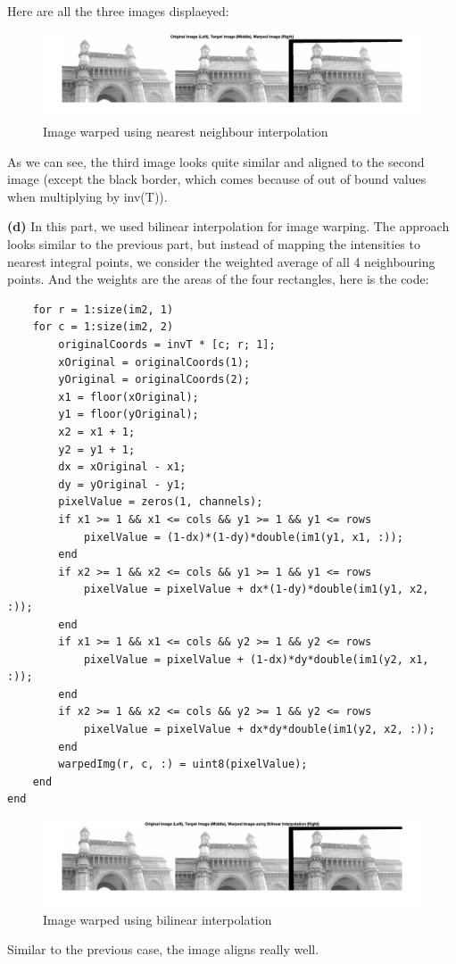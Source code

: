 \documentclass[12pt]{article}
\begin{document}
Here are all the three images displaeyed:

\begin{figure}[h]
    \centering
    \includegraphics[width=\linewidth]{nearest.jpg}
    \caption{Image warped using nearest neighbour interpolation}
\end{figure}

As we can see, the third image looks quite similar and aligned to the second image (except the black border, which comes because of out of bound values when multiplying by inv(T)).


\textbf{(d)}
In this part, we used bilinear interpolation for image warping. The approach looks similar to the previous part, but instead of mapping the intensities to nearest integral points, we consider the weighted average of all 4 neighbouring points. And the weights are the areas of the four rectangles, here is the code:
\begin{verbatim}
    for r = 1:size(im2, 1)
    for c = 1:size(im2, 2)
        originalCoords = invT * [c; r; 1];
        xOriginal = originalCoords(1);
        yOriginal = originalCoords(2);
        x1 = floor(xOriginal);
        y1 = floor(yOriginal);
        x2 = x1 + 1;
        y2 = y1 + 1;
        dx = xOriginal - x1;
        dy = yOriginal - y1;
        pixelValue = zeros(1, channels);
        if x1 >= 1 && x1 <= cols && y1 >= 1 && y1 <= rows
            pixelValue = (1-dx)*(1-dy)*double(im1(y1, x1, :));
        end
        if x2 >= 1 && x2 <= cols && y1 >= 1 && y1 <= rows
            pixelValue = pixelValue + dx*(1-dy)*double(im1(y1, x2, :));
        end
        if x1 >= 1 && x1 <= cols && y2 >= 1 && y2 <= rows
            pixelValue = pixelValue + (1-dx)*dy*double(im1(y2, x1, :));
        end
        if x2 >= 1 && x2 <= cols && y2 >= 1 && y2 <= rows
            pixelValue = pixelValue + dx*dy*double(im1(y2, x2, :));
        end
        warpedImg(r, c, :) = uint8(pixelValue);
    end
end   
\end{verbatim} 
\begin{figure}[h]
    \centering
    \includegraphics[width=\linewidth]{bilinear.jpg}
    \caption{Image warped using bilinear interpolation}
\end{figure}
Similar to the previous case, the image aligns really well.
\end{document}
